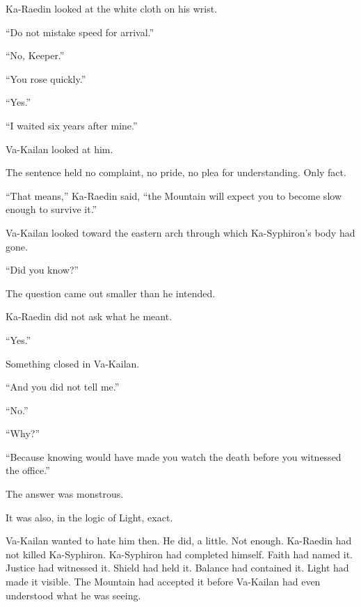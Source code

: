 Ka-Raedin looked at the white cloth on his wrist.\par

“Do not mistake speed for arrival.”\par

“No, Keeper.”\par

“You rose quickly.”\par

“Yes.”\par

“I waited six years after mine.”\par

Va-Kailan looked at him.\par

The sentence held no complaint, no pride, no plea for understanding. Only fact.\par

“That means,” Ka-Raedin said, “the Mountain will expect you to become slow enough to survive it.”\par

Va-Kailan looked toward the eastern arch through which Ka-Syphiron’s body had gone.\par

“Did you know?”\par

The question came out smaller than he intended.\par

Ka-Raedin did not ask what he meant.\par

“Yes.”\par

Something closed in Va-Kailan.\par

“And you did not tell me.”\par

“No.”\par

“Why?”\par

“Because knowing would have made you watch the death before you witnessed the office.”\par

The answer was monstrous.\par

It was also, in the logic of Light, exact.\par

Va-Kailan wanted to hate him then. He did, a little. Not enough. Ka-Raedin had not killed Ka-Syphiron. Ka-Syphiron had completed himself. Faith had named it. Justice had witnessed it. Shield had held it. Balance had contained it. Light had made it visible. The Mountain had accepted it before Va-Kailan had even understood what he was seeing.\par

